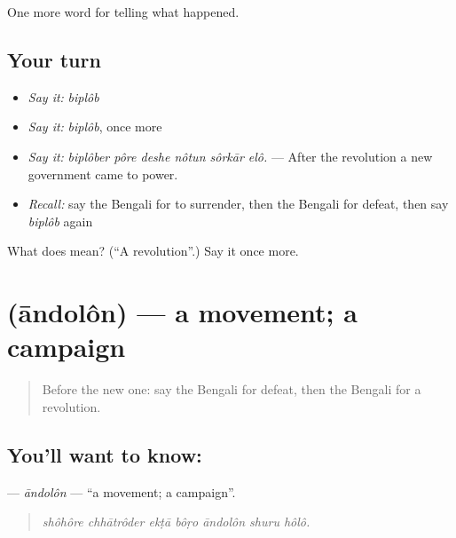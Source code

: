 \begin{grammarlens}[title={What you've built}]
One more word for telling what happened.
\end{grammarlens}

\subsection*{Your turn}
\begin{itemize}
\raggedright
  \item \emph{Say it:} \emph{biplôb}
  \item \emph{Say it:} \emph{biplôb}, once more
  \item \emph{Say it:} \emph{biplôber pôre deshe nôtun sôrkār elô.} — After the revolution a new government came to power.
  \item \emph{Recall:} say the Bengali for to surrender, then the Bengali for defeat, then say \emph{biplôb} again
\end{itemize}

\begin{tcolorbox}[breakable,colback=teal!4,colframe=teal!35!black,title={Before you move on}]
What does  mean? (\textquotedblleft{}A revolution\textquotedblright{}.) Say it once more.
\end{tcolorbox}
\section[\texorpdfstring{\bn{আন্দোলন} (āndolôn)}{আন্দোলন (āndolôn)}]{ (āndolôn) — a movement; a campaign}

\label{lesson:BN-C318-andolon}



\begin{quote}
Before the new one: say the Bengali for defeat, then the Bengali for a revolution.
\end{quote}

\subsection*{You'll want to know: }
\textbf{} — \emph{āndolôn} — \textquotedblleft{}a movement; a campaign\textquotedblright{}.

\begin{quote}
      
\end{quote}

\begin{quote}
\emph{shôhôre chhātrôder ekṭā bôṛo āndolôn shuru hôlô.}
\end{quote}

